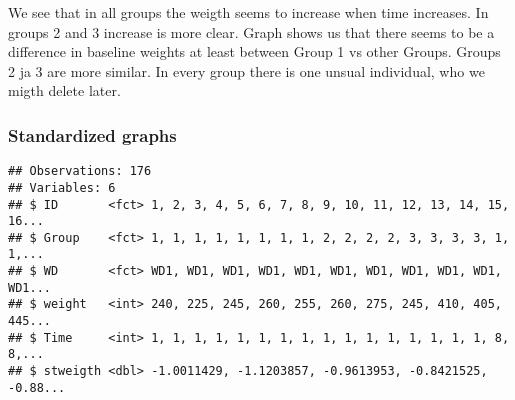 \documentclass[]{article}
\newenvironment{Shaded}{\begin{snugshade}}{\end{snugshade}}
\newcommand{\KeywordTok}[1]{\textcolor[rgb]{0.13,0.29,0.53}{\textbf{#1}}}
\newcommand{\DataTypeTok}[1]{\textcolor[rgb]{0.13,0.29,0.53}{#1}}
\newcommand{\StringTok}[1]{\textcolor[rgb]{0.31,0.60,0.02}{#1}}
\newcommand{\OperatorTok}[1]{\textcolor[rgb]{0.81,0.36,0.00}{\textbf{#1}}}
\newcommand{\NormalTok}[1]{#1}
\begin{document}
We see that in all groups the weigth seems to increase when time
increases. In groups 2 and 3 increase is more clear. Graph shows us that
there seems to be a difference in baseline weights at least between
Group 1 vs other Groups. Groups 2 ja 3 are more similar. In every group
there is one unsual individual, who we migth delete later.

\subsubsection{Standardized graphs}\label{standardized-graphs}

\begin{Shaded}
\end{Shaded}

\begin{verbatim}
## Observations: 176
## Variables: 6
## $ ID       <fct> 1, 2, 3, 4, 5, 6, 7, 8, 9, 10, 11, 12, 13, 14, 15, 16...
## $ Group    <fct> 1, 1, 1, 1, 1, 1, 1, 1, 2, 2, 2, 2, 3, 3, 3, 3, 1, 1,...
## $ WD       <fct> WD1, WD1, WD1, WD1, WD1, WD1, WD1, WD1, WD1, WD1, WD1...
## $ weight   <int> 240, 225, 245, 260, 255, 260, 275, 245, 410, 405, 445...
## $ Time     <int> 1, 1, 1, 1, 1, 1, 1, 1, 1, 1, 1, 1, 1, 1, 1, 1, 8, 8,...
## $ stweigth <dbl> -1.0011429, -1.1203857, -0.9613953, -0.8421525, -0.88...
\end{verbatim}
\end{document}
